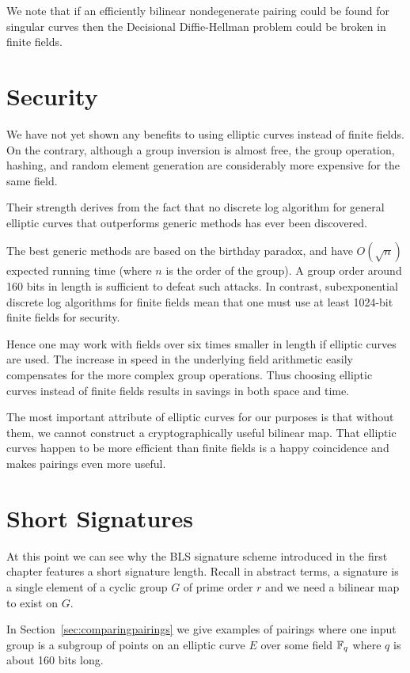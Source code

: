 We note that if an efficiently bilinear nondegenerate pairing could be found
for singular curves then the Decisional Diffie-Hellman problem could be broken
in finite fields.

\section {\label{sec:eccsec} Security}

We have not yet shown any benefits to using elliptic curves instead
of finite fields. On the contrary, although a group inversion is
almost free, the group operation, hashing, and random element generation
are considerably more expensive for the same field.

Their strength derives from the fact that no discrete log algorithm for
general elliptic curves that outperforms generic methods has ever been
discovered.

The best generic methods are based on the birthday paradox, and have
$O(\sqrt{n})$ expected running time (where $n$ is the order of the group).
A group order around 160 bits in length is sufficient to defeat such attacks.
In contrast, subexponential discrete log algorithms for finite fields
mean that one must use at least 1024-bit finite fields for security.

Hence one may work with fields over six times smaller in length
if elliptic curves are used. The increase in speed in
the underlying field arithmetic easily compensates for the more
complex group operations. Thus choosing elliptic curves instead of
finite fields results in savings in both space and time.

The most important attribute of elliptic curves for our purposes
is that without them, we cannot construct a cryptographically
useful bilinear map. That elliptic curves happen to be more
efficient than finite fields
is a happy coincidence and makes pairings even more useful.

\section {Short Signatures}

At this point we can see why
the BLS signature scheme introduced
in the first chapter features a short signature length.
Recall in abstract terms,
a signature is a single element of a cyclic group $G$ of prime order $r$
and we need a bilinear map to exist on $G$.

In Section~\ref{sec:comparingpairings} we give examples
of pairings where one input group is a subgroup of points
on an elliptic curve $E$ over some field $\mathbb{F}_q$ where
$q$ is about 160 bits long.

